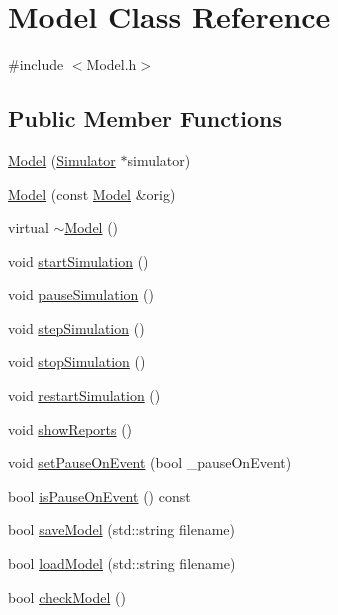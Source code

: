 \hypertarget{class_model}{\section{Model Class Reference}
\label{class_model}
}


{\ttfamily \#include $<$Model.\-h$>$}

\subsection*{Public Member Functions}
\begin{DoxyCompactItemize}
\item 
\hyperlink{class_model_ae86e1403523e8036ba6366d1967ecac0}{Model} (\hyperlink{class_simulator}{Simulator} $\ast$simulator)
\item 
\hyperlink{class_model_afdedf278781f785abeecf5f450e43653}{Model} (const \hyperlink{class_model}{Model} \&orig)
\item 
virtual \hyperlink{class_model_ad6ebd2062a0b823db841a0b88baac4c0}{$\sim$\-Model} ()
\item 
void \hyperlink{class_model_a6fd6613a5141552a6493eb3a840cde24}{start\-Simulation} ()
\item 
void \hyperlink{class_model_ab10d4bdc433d11bf4bb7117675091d8c}{pause\-Simulation} ()
\item 
void \hyperlink{class_model_a025b6ab3112a1df6f7773389b096302c}{step\-Simulation} ()
\item 
void \hyperlink{class_model_a6452e846a5e560220236b7a59f1dd84b}{stop\-Simulation} ()
\item 
void \hyperlink{class_model_a8be70da19c6c315269acc5a3fd2e3b7d}{restart\-Simulation} ()
\item 
void \hyperlink{class_model_a44c66f552308e7a6a5701801186a8637}{show\-Reports} ()
\item 
void \hyperlink{class_model_a99238439363a292fe1fc503eb2157a55}{set\-Pause\-On\-Event} (bool \-\_\-pause\-On\-Event)
\item 
bool \hyperlink{class_model_a1dda07db7bddff456907067eeeb5c21a}{is\-Pause\-On\-Event} () const 
\item 
bool \hyperlink{class_model_ae099910781f5267a51fb5d607246af4a}{save\-Model} (std\-::string filename)
\item 
bool \hyperlink{class_model_aba57e8b62d4dcc3ac8e3037933fa6f04}{load\-Model} (std\-::string filename)
\item 
bool \hyperlink{class_model_ae3b293adffbef6fd254d661ceeb2e116}{check\-Model} ()

\end{DoxyCompactItemize}

